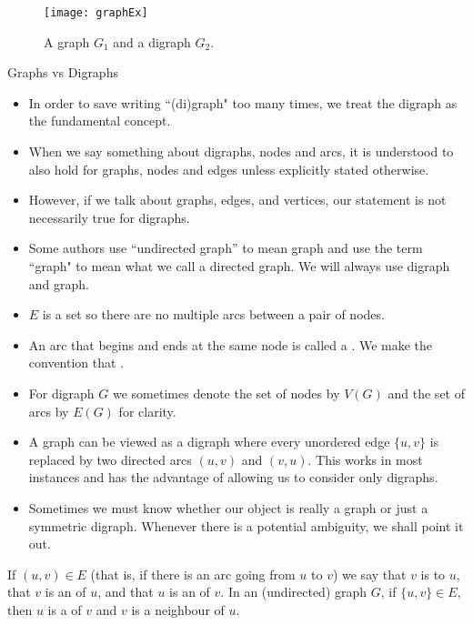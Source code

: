 \begin{figure}
  \centering
  \texttt{[image: graphEx]}
  \caption{A graph $G_1$ and a digraph $G_2$.}
  \label{fig:graphExample}
\end{figure}


\begin{note}
Graphs vs Digraphs
\begin{itemize}
  \item In order to save writing ``(di)graph" too many times, we treat the digraph as the fundamental concept.
  \item When we say something about digraphs, nodes and arcs, it is understood to also hold for graphs, nodes and edges unless explicitly stated otherwise. 
  \item However, if we talk about graphs, edges, and vertices, our statement is not necessarily true for digraphs. 
  \item Some authors use ``undirected graph'' to mean graph and use the term ``graph" to mean what we call a directed graph. We will always use digraph and graph.
  \item $E$ is a set so there are no multiple arcs between a pair of nodes.
 \item  An arc that begins and ends at the same node is called a . 
  We make the convention that . 
  \item For digraph $G$ we sometimes denote the set of nodes by $V(G)$
  and the set of arcs by $E(G)$ for clarity.
  \item A graph can be viewed as a digraph where every unordered edge $\{u, v\}$ 
  is replaced by two directed arcs $(u, v)$ and $(v, u)$.  
  This works in most instances and has the advantage of allowing us to consider only digraphs.
  \item Sometimes we must know whether our object is really a graph or just a symmetric digraph. Whenever there
  is a potential ambiguity, we shall point it out.
 \end{itemize}
\end{note}


\begin{Definition}\label{def:adjacent}  
If $(u, v)\in E$ (that is, if there is an arc going from $u$ to $v$) we say that $v$ is  
to $u$, that $v$ is an  of $u$, and that $u$ is an  of $v$.
In an (undirected) graph $G$, if $\{u, v\} \in E$, then $u$ is a  of $v$ and $v$ is a neighbour of $u$. 
\end{Definition}

